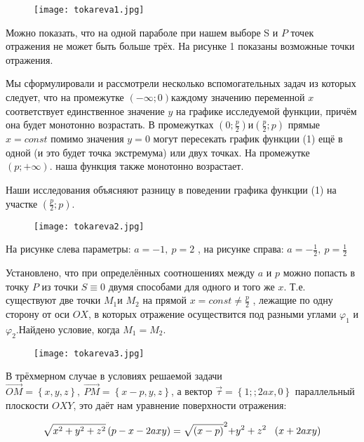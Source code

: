 \begin{figure}
	\centering
	\texttt{[image: tokareva1.jpg]}
\end{figure}

Можно показать, что на одной параболе при нашем выборе S и $P$ точек отражения не может быть больше трёх. На рисунке 1 показаны возможные точки отражения.

Мы сформулировали и рассмотрели несколько вспомогательных задач из которых следует, что на промежутке $\left(-\infty ;0\right)$каждому значению переменной $x$ соответствует единственное значение $y$ на графике исследуемой функции, причём она будет монотонно возрастать. В промежутках $\left(0;\frac{p}{2}\right)и\left(\frac{p}{2};p\right)$ прямые $x=const$ помимо значения $y=0$ могут пересекать график функции (1) ещё в одной (и это будет точка экстремума) или двух точках. На промежутке $\left(p;+\infty \right).$ наша функция также монотонно возрастает.

Наши исследования объясняют разницу в поведении графика функции (1) на участке $\left(\frac{p}{2};p\right)$.

\begin{figure}
	\centering
	\texttt{[image: tokareva2.jpg]}
\end{figure}

На рисунке слева параметры: $a=-1,\ p=2$ , на рисунке справа: $a=-\frac{1}{2},\ p=\frac{1}{2}$

Установлено, что при определённых соотношениях между $a$ и $p$ можно попасть в точку $P$ из точки $S\equiv 0$ двумя способами для одного и того же $x$. Т.е. существуют две точки $M_1 $и $M_2$ на прямой $x=const\ne \frac{p}{2}$ , лежащие по одну сторону от оси $OX$, в которых отражение осуществится под разными углами $\varphi_1$ и $\varphi_2$.Найдено условие, когда $M_1=M_2$.

\begin{figure}
	\centering
	\texttt{[image: tokareva3.jpg]}
\end{figure}

В трёхмерном случае в условиях решаемой задачи $\overrightarrow{OM}=\left\{x,y,z\right\},\ \overrightarrow{PM}=\left\{x-p,y,z\right\}$, а вектор $\overrightarrow{\tau }=\left\{1;;2ax,0\right\}$ параллельный плоскости $OXY$, это даёт нам уравнение поверхности отражения:

\begin{equation} \label{GrindEQ__2_} \sqrt{x^2+y^2+z^2}\left(p-x-2axy\right)=\sqrt{(x-p)}^{{\rm 2}}{\rm +}y^{{\rm 2}}+z^{{\rm 2}}\ \ \left(x+2axy\right) \end{equation}

